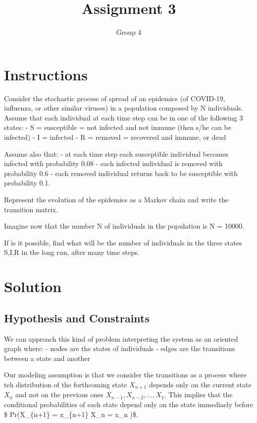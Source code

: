 \documentclass[
]{article}
\title{Assignment 3}
\author{Group 4}
\date{}
\begin{document}
\maketitle

\hypertarget{instructions}{%
\section{Instructions}\label{instructions}}

Consider the stochastic process of spread of an epidemics (of COVID-19,
influenza, or other similar viruses) in a population composed by N
individuals. Assume that each individual at each time step can be in one
of the following 3 states: - S = susceptible = not infected and not
immune (then s/he can be infected) - I = infected - R = removed =
recovered and immune, or dead

Assume also that: - at each time step each susceptible individual
becomes infected with probability 0.08 - each infected individual is
removed with probability 0.6 - each removed individual returns back to
be susceptible with probability 0.1.

Represent the evolution of the epidemics as a Markov chain and write the
transition matrix.

Imagine now that the number N of individuals in the population is N =
10000.

If is it possible, find what will be the number of individuals in the
three states S,I,R in the long run, after many time steps.

\hypertarget{solution}{%
\section{Solution}\label{solution}}

\hypertarget{hypothesis-and-constraints}{%
\subsection{Hypothesis and
Constraints}\label{hypothesis-and-constraints}}

We can approach this kind of problem interpreting the system as an
oriented graph where: - nodes are the states of individuals - edges are
the transitions between a state and another

Our modeling assumption is that we consider the transitions as a process
where teh distribution of the forthcoming state \(X_{n+1}\) depends only
on the current state \(X_n\) and not on the previous ones
\(X_{n−1}, X_{n−2},...,X_1\). This implies that the conditional
probabilities of each state depend only on the state immediaely before
\$ Pr(X\_\{n+1\} = x\_\{n+1\} \textbar X\_n = x\_n )\$.
\end{document}
